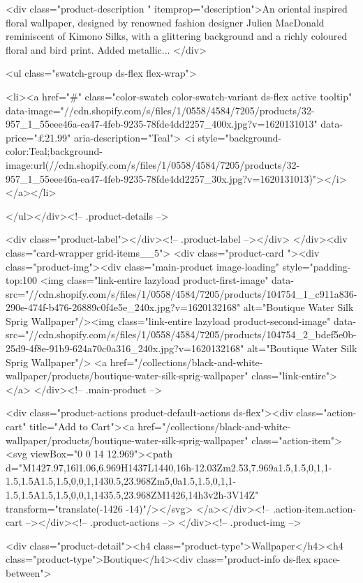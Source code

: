 {{{{{{{<div class="product-description " itemprop="description">An oriental inspired floral wallpaper, designed by renowned fashion designer Julien MacDonald reminiscent of Kimono Silks, with a glittering background and a richly coloured floral and bird print. Added metallic...
</div>



<ul class="swatch-group ds-flex flex-wrap">
        
<li><a href="#" class="color-swatch color-swatch-variant ds-flex active tooltip" data-image="//cdn.shopify.com/s/files/1/0558/4584/7205/products/32-957_1_55eee46a-ea47-4feb-9235-78fde4dd2257_400x.jpg?v=1620131013" data-price="£21.99" aria-description="Teal">
              <i style="background-color:Teal;background-image:url(//cdn.shopify.com/s/files/1/0558/4584/7205/products/32-957_1_55eee46a-ea47-4feb-9235-78fde4dd2257_30x.jpg?v=1620131013)"></i>
            </a></li>

      </ul></div><!-- .product-details -->

<div class="product-label"></div><!-- .product-label --></div>
          </div><div class="card-wrapper grid-items__5">
            <div class="product-card "><div class="product-img"><div class="main-product image-loading" style="padding-top:100%
      <img class="link-entire lazyload product-first-image" data-src="//cdn.shopify.com/s/files/1/0558/4584/7205/products/104754_1_c911a836-290e-474f-b476-26889c0f4e5e_240x.jpg?v=1620132168" alt="Boutique Water Silk Sprig Wallpaper"/><img class="link-entire lazyload product-second-image" data-src="//cdn.shopify.com/s/files/1/0558/4584/7205/products/104754_2_bdef5e0b-25d9-4f8e-91b9-624a70c0a316_240x.jpg?v=1620132168" alt="Boutique Water Silk Sprig Wallpaper"/>
      <a href="/collections/black-and-white-wallpaper/products/boutique-water-silk-sprig-wallpaper" class="link-entire"></a>
    </div><!-- .main-product -->
  
<div class="product-actions product-default-actions ds-flex"><div class="action-cart" title="Add to Cart"><a href="/collections/black-and-white-wallpaper/products/boutique-water-silk-sprig-wallpaper" class="action-item"><svg viewBox="0 0 14 12.969"><path d="M1427.97,16l1.06,6.969H1437L1440,16h-12.03Zm2.53,7.969a1.5,1.5,0,1,1-1.5,1.5A1.5,1.5,0,0,1,1430.5,23.968Zm5,0a1.5,1.5,0,1,1-1.5,1.5A1.5,1.5,0,0,1,1435.5,23.968ZM1426,14h3v2h-3V14Z" transform="translate(-1426 -14)"/></svg>
</a></div><!-- .action-item.action-cart --></div><!-- .product-actions -->
</div><!-- .product-img -->

<div class="product-detail"><h4 class="product-type">Wallpaper</h4><h4 class="product-type">Boutique</h4><div class="product-info ds-flex space-between">
    
}}}}}}}
